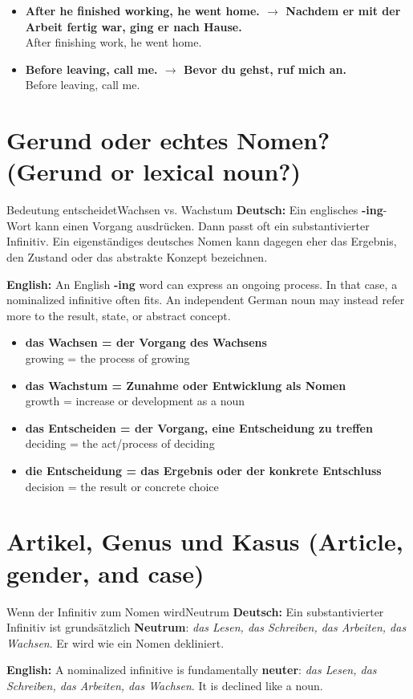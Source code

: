 \documentclass[a4paper,11pt]{article}
\newcommand{\GermanText}[1]{\textbf{Deutsch: }#1\par}
\newcommand{\EnglishText}[1]{{\small\color{SoftGray}\textbf{English: }#1\par}}
\newcommand{\ExampleItem}[2]{\item \textbf{#1}\\{\small\color{SoftGray}#2}}
\begin{document}
\begin{exbox}
\begin{itemize}
\ExampleItem{After he finished working, he went home. $\rightarrow$ Nachdem er mit der Arbeit fertig war, ging er nach Hause.}{After finishing work, he went home.}
\ExampleItem{Before leaving, call me. $\rightarrow$ Bevor du gehst, ruf mich an.}{Before leaving, call me.}
\end{itemize}
\end{exbox}

\section{Gerund oder echtes Nomen? \textnormal{(Gerund or lexical noun?)}}
\begin{grammarentry}{Bedeutung entscheidet}{Wachsen vs. Wachstum}
\GermanText{Ein englisches \textbf{-ing}-Wort kann einen Vorgang ausdrücken. Dann passt oft ein substantivierter Infinitiv. Ein eigenständiges deutsches Nomen kann dagegen eher das Ergebnis, den Zustand oder das abstrakte Konzept bezeichnen.}
\EnglishText{An English \textbf{-ing} word can express an ongoing process. In that case, a nominalized infinitive often fits. An independent German noun may instead refer more to the result, state, or abstract concept.}
\end{grammarentry}

\begin{exbox}
\begin{itemize}
\ExampleItem{das Wachsen = der Vorgang des Wachsens}{growing = the process of growing}
\ExampleItem{das Wachstum = Zunahme oder Entwicklung als Nomen}{growth = increase or development as a noun}
\ExampleItem{das Entscheiden = der Vorgang, eine Entscheidung zu treffen}{deciding = the act/process of deciding}
\ExampleItem{die Entscheidung = das Ergebnis oder der konkrete Entschluss}{decision = the result or concrete choice}
\end{itemize}
\end{exbox}

\section{Artikel, Genus und Kasus \textnormal{(Article, gender, and case)}}
\begin{grammarentry}{Wenn der Infinitiv zum Nomen wird}{Neutrum}
\GermanText{Ein substantivierter Infinitiv ist grundsätzlich \textbf{Neutrum}: \textit{das Lesen, das Schreiben, das Arbeiten, das Wachsen}. Er wird wie ein Nomen dekliniert.}
\EnglishText{A nominalized infinitive is fundamentally \textbf{neuter}: \textit{das Lesen, das Schreiben, das Arbeiten, das Wachsen}. It is declined like a noun.}
\end{grammarentry}
\end{document}
